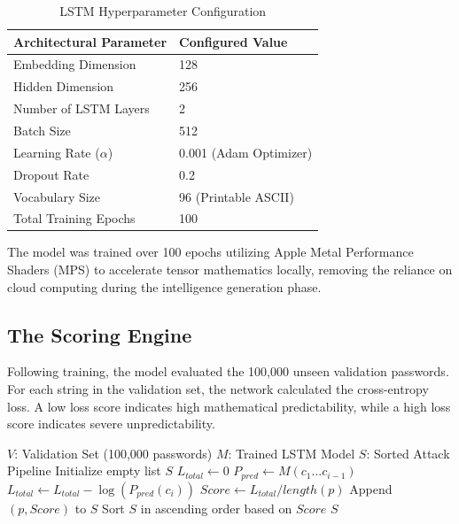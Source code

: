 \documentclass[conference]{IEEEtran}
\begin{document}
\begin{table}[htbp]
\renewcommand{\arraystretch}{1.4}
\caption{LSTM Hyperparameter Configuration}
\begin{center}
\begin{tabular}{@{}ll@{}}
\toprule
\textbf{Architectural Parameter} & \textbf{Configured Value} \\ \midrule
Embedding Dimension & 128 \\
Hidden Dimension & 256 \\
Number of LSTM Layers & 2 \\
Batch Size & 512 \\
Learning Rate ($\alpha$) & 0.001 (Adam Optimizer) \\
Dropout Rate & 0.2 \\
Vocabulary Size & 96 (Printable ASCII) \\
Total Training Epochs & 100 \\ \bottomrule
\end{tabular}
\label{tab:hyperparameters}
\end{center}
\end{table}

The model was trained over 100 epochs utilizing Apple Metal Performance Shaders (MPS) \cite{apple_mps} to accelerate tensor mathematics locally, removing the reliance on cloud computing during the intelligence generation phase.

\subsection{The Scoring Engine}
Following training, the model evaluated the 100,000 unseen validation passwords. For each string in the validation set, the network calculated the cross-entropy loss. A low loss score indicates high mathematical predictability, while a high loss score indicates severe unpredictability. 

\begin{algorithm}
\caption{Neural Ranked Guessing Pipeline}
\begin{algorithmic}[1]
\REQUIRE $V$: Validation Set (100,000 passwords)
\REQUIRE $M$: Trained LSTM Model
\ENSURE $S$: Sorted Attack Pipeline
\STATE Initialize empty list $S$
    \STATE $L_{total} \leftarrow 0$
        \STATE $P_{pred} \leftarrow M(c_1 \dots c_{i-1})$
        \STATE $L_{total} \leftarrow L_{total} - \log(P_{pred}(c_i))$
    \ENDFOR
    \STATE $Score \leftarrow L_{total} / length(p)$
    \STATE Append $(p, Score)$ to $S$
\ENDFOR
\STATE Sort $S$ in ascending order based on $Score$
\RETURN $S$
\end{algorithmic}
\end{algorithm}
\end{document}
